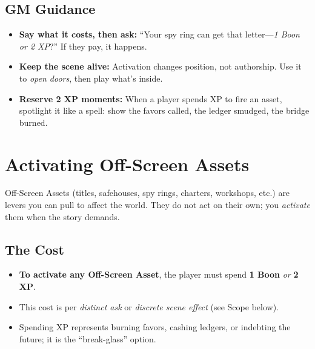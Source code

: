 \documentclass[12pt]{book}
\begin{document}
\subsection*{GM Guidance}
\begin{itemize}
  \item \textbf{Say what it costs, then ask:} ``Your spy ring can get that letter—\emph{1 Boon or 2 XP}?'' If they pay, it happens.
  \item \textbf{Keep the scene alive:} Activation changes position, not authorship. Use it to \emph{open doors}, then play what’s inside.
  \item \textbf{Reserve 2 XP moments:} When a player spends XP to fire an asset, spotlight it like a spell: show the favors called, the ledger smudged, the bridge burned.
\end{itemize}

\section{Activating Off-Screen Assets}
\label{sec:asset-activation}

Off-Screen Assets (titles, safehouses, spy rings, charters, workshops, etc.) are levers you can pull to affect the world. They do not act on their own; you \emph{activate} them when the story demands.

\subsection*{The Cost}
\begin{itemize}
  \item \textbf{To activate any Off-Screen Asset}, the player must spend \textbf{1 Boon} \emph{or} \textbf{2 XP}.
  \item This cost is per \emph{distinct ask} or \emph{discrete scene effect} (see Scope below).
  \item Spending XP represents burning favors, cashing ledgers, or indebting the future; it is the ``break-glass'' option.
\end{itemize}
\end{document}
